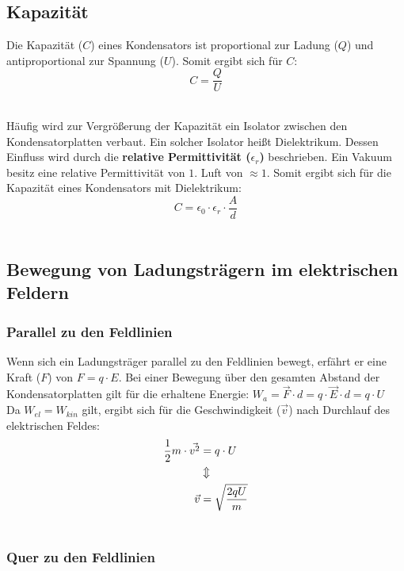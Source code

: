 \documentclass[a4paper]{article}
\begin{document}
\subsection{Kapazität}

Die Kapazität ($C$) eines Kondensators ist proportional zur Ladung ($Q$) und antiproportional zur Spannung ($U$).
Somit ergibt sich für $C$:
\Large$$C = \dfrac{Q}{U}$$\\ \normalsize

Häufig wird zur Vergrößerung der Kapazität ein Isolator zwischen den Kondensatorplatten verbaut. Ein solcher Isolator
heißt Dielektrikum. Dessen Einfluss wird durch die \textbf{relative Permittivität ($\epsilon_r$)} beschrieben. Ein Vakuum besitz eine
relative Permittivität von $1$. Luft von $\approx 1$. Somit ergibt sich für die Kapazität eines Kondensators mit
Dielektrikum:\\
\Large$$C = \epsilon_0 \cdot \epsilon_r \cdot \dfrac{A}{d}$$\\ \normalsize



\newpage
\subsection{Bewegung von Ladungsträgern im elektrischen Feldern}
\subsubsection{Parallel zu den Feldlinien}

Wenn sich ein Ladungsträger parallel zu den Feldlinien bewegt, erfährt er eine Kraft ($F$) von $F = q \cdot E$.
Bei einer Bewegung über den gesamten Abstand der Kondensatorplatten gilt für die erhaltene Energie:
$W_a = \vec{F} \cdot d = q \cdot \vec{E} \cdot d = q \cdot U$\\
Da $W_{el} = W_{kin}$ gilt, ergibt sich für die Geschwindigkeit ($\vec{v}$) nach Durchlauf des elektrischen
Feldes:\\
\begin{align*}
	\small \frac{1}{2}m \cdot \vec{v^2} &= q \cdot U\\
	 &\Updownarrow\\
	\Large \vec{v} &= \sqrt{\dfrac{2qU}{m}}\\ \normalsize
\end{align*}



\subsubsection{Quer zu den Feldlinien}
\end{document}
